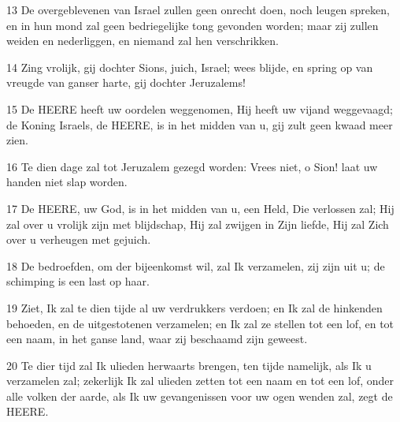 \par 13 De overgeblevenen van Israel zullen geen onrecht doen, noch leugen spreken, en in hun mond zal geen bedriegelijke tong gevonden worden; maar zij zullen weiden en nederliggen, en niemand zal hen verschrikken.
\par 14 Zing vrolijk, gij dochter Sions, juich, Israel; wees blijde, en spring op van vreugde van ganser harte, gij dochter Jeruzalems!
\par 15 De HEERE heeft uw oordelen weggenomen, Hij heeft uw vijand weggevaagd; de Koning Israels, de HEERE, is in het midden van u, gij zult geen kwaad meer zien.
\par 16 Te dien dage zal tot Jeruzalem gezegd worden: Vrees niet, o Sion! laat uw handen niet slap worden.
\par 17 De HEERE, uw God, is in het midden van u, een Held, Die verlossen zal; Hij zal over u vrolijk zijn met blijdschap, Hij zal zwijgen in Zijn liefde, Hij zal Zich over u verheugen met gejuich.
\par 18 De bedroefden, om der bijeenkomst wil, zal Ik verzamelen, zij zijn uit u; de schimping is een last op haar.
\par 19 Ziet, Ik zal te dien tijde al uw verdrukkers verdoen; en Ik zal de hinkenden behoeden, en de uitgestotenen verzamelen; en Ik zal ze stellen tot een lof, en tot een naam, in het ganse land, waar zij beschaamd zijn geweest.
\par 20 Te dier tijd zal Ik ulieden herwaarts brengen, ten tijde namelijk, als Ik u verzamelen zal; zekerlijk Ik zal ulieden zetten tot een naam en tot een lof, onder alle volken der aarde, als Ik uw gevangenissen voor uw ogen wenden zal, zegt de HEERE.



